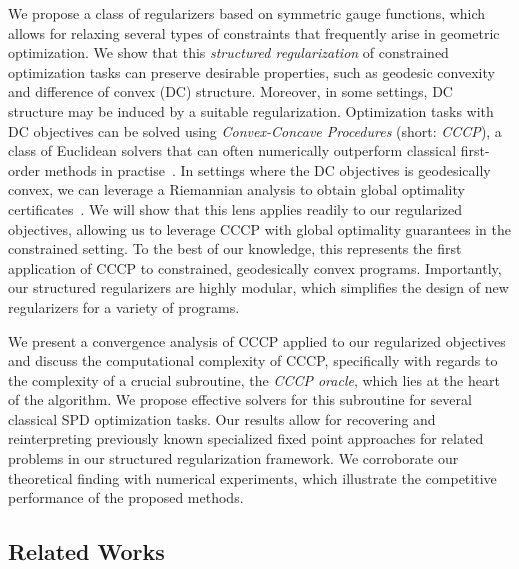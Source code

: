 \documentclass[sn-nature]{sn-jnl}%
\theoremstyle{thmstyleone}%
\theoremstyle{thmstyletwo}%
\theoremstyle{thmstylethree}%
\begin{document}
We propose a class of regularizers based on symmetric gauge functions, which allows for relaxing several types of constraints that frequently arise in geometric optimization.  We show that this \emph{structured regularization} of constrained optimization tasks can preserve desirable properties, such as geodesic convexity and difference of convex (DC) structure.  Moreover, in some settings,  DC structure may be induced by a suitable regularization. Optimization tasks with DC objectives can be solved using \emph{Convex-Concave Procedures} (short: \emph{CCCP}),  a class of Euclidean solvers that can often numerically outperform classical first-order methods in practise~\citep{sra2013sdivergence,wiesel2012geodesic}.  In settings where the DC objectives is geodesically convex, we can leverage a Riemannian analysis to obtain global optimality certificates~\citep{pmlr-v202-weber23a}.  We will show that this lens applies readily to our regularized objectives, allowing us to leverage CCCP with global optimality guarantees in the constrained setting. To the best of our knowledge, this represents the first application of CCCP to constrained, geodesically convex programs. Importantly, our structured regularizers are highly modular, which simplifies the design of new regularizers for a variety of programs. 

We present a convergence analysis of CCCP applied to our regularized objectives and discuss the computational complexity of CCCP, specifically with regards to the complexity of a crucial subroutine, the \emph{CCCP oracle}, which lies at the heart of the algorithm. We propose effective solvers for this subroutine for several classical SPD optimization tasks. 
Our results allow for recovering and reinterpreting previously known specialized fixed point approaches for related problems in our structured regularization framework. 
We corroborate our theoretical finding with numerical experiments, which illustrate the competitive performance of the proposed methods.



\subsection{Related Works}
\end{document}
